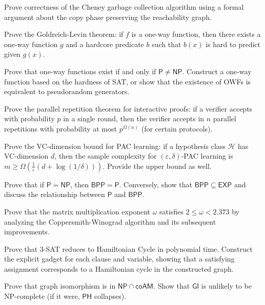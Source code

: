 \documentclass[12pt,a4paper]{exam}
\begin{document}
\begin{questions}
\question[3]
Prove correctness of the Cheney garbage collection algorithm using a formal argument about the copy phase preserving the reachability graph.

\vspace{0.3cm}

\question[4]
Prove the Goldreich-Levin theorem: if $f$ is a one-way function, then there exists a one-way function $g$ and a hardcore predicate $b$ such that $b(x)$ is hard to predict given $g(x)$.

\vspace{0.3cm}

\question[9]
Prove that one-way functions exist if and only if $\mathsf{P} \neq \mathsf{NP}$. Construct a one-way function based on the hardness of SAT, or show that the existence of OWFs is equivalent to pseudorandom generators.

\vspace{0.3cm}

\question[3]
Prove the parallel repetition theorem for interactive proofs: if a verifier accepts with probability $p$ in a single round, then the verifier accepts in $n$ parallel repetitions with probability at most $p^{\Omega(n)}$ (for certain protocols).

\vspace{0.3cm}

\question[2]
Prove the VC-dimension bound for PAC learning: if a hypothesis class $\mathcal{H}$ has VC-dimension $d$, then the sample complexity for $(\varepsilon,\delta)$-PAC learning is $m \geq \Omega(\frac{1}{\varepsilon}(d + \log(1/\delta)))$. Provide the upper bound as well.

\vspace{0.3cm}

\question[6]
Prove that if $\mathsf{P} = \mathsf{NP}$, then $\mathsf{BPP} = \mathsf{P}$. Conversely, show that $\mathsf{BPP} \subseteq \mathsf{EXP}$ and discuss the relationship between $\mathsf{P}$ and $\mathsf{BPP}$.

\vspace{0.3cm}

\question[3]
Prove that the matrix multiplication exponent $\omega$ satisfies $2 \leq \omega < 2.373$ by analyzing the Coppersmith-Winograd algorithm and its subsequent improvements.

\vspace{0.3cm}

\question[3]
Prove that 3-SAT reduces to Hamiltonian Cycle in polynomial time. Construct the explicit gadget for each clause and variable, showing that a satisfying assignment corresponds to a Hamiltonian cycle in the constructed graph.

\vspace{0.3cm}

\question[2]
Prove that graph isomorphism is in $\mathsf{NP} \cap \mathsf{coAM}$. Show that $\mathsf{GI}$ is unlikely to be NP-complete (if it were, $\mathsf{PH}$ collapses).

\vspace{0.3cm}

\end{questions}
\end{document}
